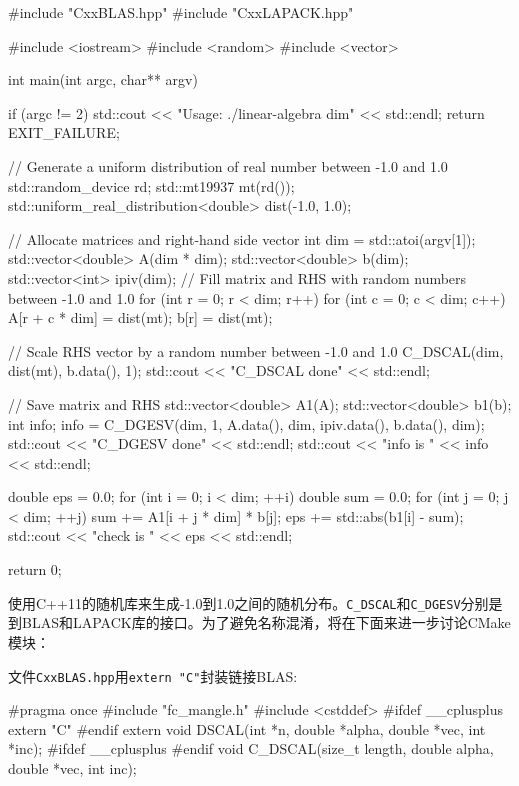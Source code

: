 \begin{codebox}[cpp]
#include "CxxBLAS.hpp"
#include "CxxLAPACK.hpp"

#include <iostream>
#include <random>
#include <vector>

int main(int argc, char** argv) {
  if (argc != 2) {
    std::cout << "Usage: ./linear-algebra dim" << std::endl;
    return EXIT_FAILURE;
  }
  
  // Generate a uniform distribution of real number between -1.0 and 1.0
  std::random_device rd;
  std::mt19937 mt(rd());
  std::uniform_real_distribution<double> dist(-1.0, 1.0);
  
  // Allocate matrices and right-hand side vector
  int dim = std::atoi(argv[1]);
  std::vector<double> A(dim * dim);
  std::vector<double> b(dim);
  std::vector<int> ipiv(dim);
  // Fill matrix and RHS with random numbers between -1.0 and 1.0
  for (int r = 0; r < dim; r++) {
    for (int c = 0; c < dim; c++) {
      A[r + c * dim] = dist(mt);
    }
    b[r] = dist(mt);
  }
  
  // Scale RHS vector by a random number between -1.0 and 1.0
  C_DSCAL(dim, dist(mt), b.data(), 1);
  std::cout << "C_DSCAL done" << std::endl;
  
  // Save matrix and RHS
  std::vector<double> A1(A);
  std::vector<double> b1(b);
  int info;
  info = C_DGESV(dim, 1, A.data(), dim, ipiv.data(), b.data(), dim);
  std::cout << "C_DGESV done" << std::endl;
  std::cout << "info is " << info << std::endl;
  
  double eps = 0.0;
  for (int i = 0; i < dim; ++i) {
    double sum = 0.0;
    for (int j = 0; j < dim; ++j)
      sum += A1[i + j * dim] * b[j];
    eps += std::abs(b1[i] - sum);
  }
  std::cout << "check is " << eps << std::endl;
  
  return 0;
}
\end{codebox}

使用C++11的随机库来生成-1.0到1.0之间的随机分布。\texttt{C\_DSCAL}和\texttt{C\_DGESV}分别是到BLAS和LAPACK库的接口。为了避免名称混淆，将在下面来进一步讨论CMake模块：

文件\texttt{CxxBLAS.hpp}用\texttt{extern "C"}封装链接BLAS:

\begin{codebox}[cpp]
#pragma once
#include "fc_mangle.h"
#include <cstddef>
#ifdef __cplusplus
extern "C" {
#endif
extern void DSCAL(int *n, double *alpha, double *vec, int *inc);
#ifdef __cplusplus
}
#endif
void C_DSCAL(size_t length, double alpha, double *vec, int inc);
\end{codebox}

